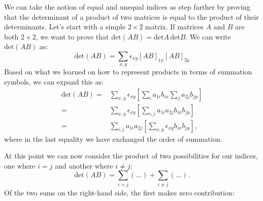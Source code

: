 We can take the notion of equal and unequal indices as step farther by proving that the determinant of a product of two matrices is equal to the product of their determinants.  Let's start with a simple $2 \times 2$ matrix.  If matrices $A$ and $B$ are both $2 \times 2$, we want to prove that $\text{det}(AB)=\text{det}A \,\text{det}B$.  We can write $\text{det}(AB)$ as:
\[
\text{det}(AB)= \sum_{x,y} \epsilon_{xy} [AB]_{1x} [AB]_{2y}
\]
Based on what we learned on how to represent products in terms of summation symbols, we can expand this as:
\begin{align*}
\text{det}(AB)=& \sum_{x,y} \epsilon_{xy} \left[ \sum_i a_{1i}b_{ix} \sum_j a_{2j}b_{jy}\right]\\
=&  \sum_{x,y} \epsilon_{xy} \left[ \sum_{i,j}  a_{1i}a_{2j} b_{ix}b_{jy}\right] \\
=&    \sum_{i,j}  a_{1i}a_{2j} \left[\sum_{x,y} \epsilon_{xy} b_{ix}b_{jy}\right],
\end{align*}
where in the last equality we have exchanged the order of summation.

At this point we can now consider the product of two possibilities for our indices, one where $i=j$ and another where $i \neq j$:
\[
\text{det}(AB) = \sum_{i=j}(\ldots)+\sum_{i \neq j} (\ldots) .
\]
Of the two sums on the right-hand side, the first makes zero contribution:

